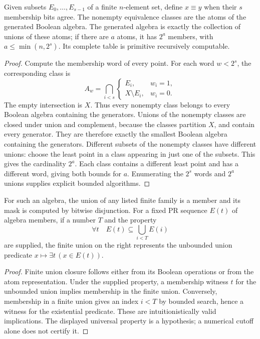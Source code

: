 \begin{theorem}
\label{thm:boolean-atoms}
Given subsets $E_0,\ldots,E_{s-1}$ of a finite $n$-element set, define
$x\equiv y$ when their $s$ membership bits agree.  The nonempty
equivalence classes are the atoms of the generated Boolean algebra.
The generated algebra is exactly the collection of unions of these
atoms; if there are $a$ atoms, it has $2^a$ members, with
$a\leq\min(n,2^s)$.  Its complete table is primitive recursively
computable.
\end{theorem}
\begin{proof}
Compute the membership word of every point.  For each word $w<2^s$,
the corresponding class is
\[
 A_w=\bigcap_{i<s}
 \begin{cases}E_i,&w_i=1,\\ X\setminus E_i,&w_i=0.\end{cases}
\]
The empty intersection is $X$.  Thus every nonempty class belongs to
every Boolean algebra containing the generators.  Unions of the
nonempty classes are closed under union and complement, because the
classes partition $X$, and contain every generator.  They are therefore
exactly the smallest Boolean algebra containing the generators.
Different subsets of the nonempty classes have different unions: choose
the least point in a class appearing in just one of the subsets.  This
gives the cardinality $2^a$.  Each class contains a different least point
and has a different word, giving both bounds for $a$.  Enumerating the
$2^s$ words and $2^a$ unions supplies explicit bounded algorithms.
\end{proof}

\begin{proposition}
For such an algebra, the union of any listed finite family is a member
and its mask is computed by bitwise disjunction.  For a fixed PR sequence
$E(t)$ of algebra members, if a number $T$ and the property
\[
   \forall t\quad E(t)\subseteq\bigcup_{i<T}E(i)
\]
are supplied, the finite union on the right represents the unbounded
union predicate $x\mapsto\exists t\,(x\in E(t))$.
\end{proposition}
\begin{proof}
Finite union closure follows either from its Boolean operations or from
the atom representation.  Under the supplied property, a membership
witness $t$ for the unbounded union implies membership in the finite
union.  Conversely, membership in a finite union gives an index $i<T$
by bounded search, hence a witness for the existential predicate.  These
are intuitionistically valid implications.  The displayed universal
property is a hypothesis; a numerical cutoff alone does not certify it.
\end{proof}

